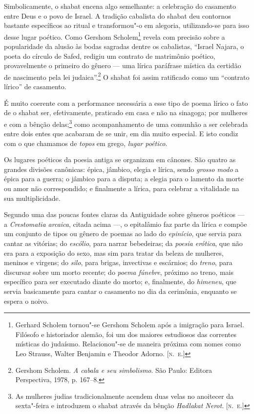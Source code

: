Simbolicamente, o shabat encena algo semelhante: a celebração do
casamento entre Deus e o povo de Israel. A tradição cabalista do shabat
deu contornos bastante específicos ao ritual e transformou"-o em
alegoria, utilizando-se para isso desse lugar poético. Como Gershom
Scholem\footnote{Gerhard Scholem tornou"-se Gershom Scholem após a imigração para Israel. Filósofo e historiador alemão, foi um dos maiores estudiosos das correntes místicas do judaísmo. Relacionou"-se de maneira próxima com nomes como Leo Strauss, Walter Benjamin e Theodor Adorno. [\textsc{n.~e.}]} revela com precisão sobre a popularidade da alusão às bodas
sagradas dentre os cabalistas, ``Israel Najara, o poeta do círculo de
Safed, redigiu um contrato de matrimônio poético, provavelmente o
primeiro do gênero --- uma lírica paráfrase mística da certidão de
nascimento pela lei judaica''.\footnote{Gershom Scholem. \emph{A cabala e seu simbolismo}. São Paulo: Editora Perspectiva, 1978, p. 167--8.} O shabat foi assim
ratificado como um ``contrato lírico'' de casamento.

É muito coerente com a performance necessária a esse tipo de poema lírico
o fato de o shabat ser, efetivamente, praticado em casa e não na sinagoga; por
mulheres e com a bênção delas;\footnote{As mulheres judias tradicionalmente acendem duas velas no anoitecer da sexta"-feira e introduzem o shabat através da bênção \emph{Hadlakat Nerot}. [\textsc{n.~e.}]} como acompanhamento de uma comunhão a ser celebrada entre dois entes que acabaram de se unir, em dia muito
especial. E isto condiz com o que chamamos de \emph{topos} em grego,
\emph{lugar poético}.


Os lugares poéticos da poesia antiga se organizam em cânones. São quatro
as grandes divisões canônicas: épica, jâmbico, elegia e lírica, sendo
\emph{grosso modo} a épica para a guerra; o jâmbico para a disputa; a
elegia para o lamento da morte ou amor não correspondido; e finalmente a
lírica, para celebrar a vitalidade na sua multiplicidade.

Segundo uma das poucas fontes claras da Antiguidade sobre gêneros
poéticos --- a \emph{Crestomatia arcaica}, citada acima ---, o
epitalâmio faz parte da lírica e compõe um conjunto de tipos ou gênero
de poemas ao lado do \emph{epinício}, que servia para cantar as
vitórias; do \emph{escólio}, para narrar bebedeiras; da \emph{poesia
erótica}, que não era para a exposição do sexo, mas sim para tratar da
beleza de mulheres, meninos e virgens; do \emph{silo}, para brigas,
invectivas e escárnios; do \emph{treno}, para discursar sobre um morto
recente; do \emph{poema fúnebre}, próximo ao treno, mais específico para
ser executado diante do morto; e, finalmente, do \emph{himeneu}, que
servia basicamente para cantar o casamento no dia da cerimônia,
enquanto se espera o noivo.

